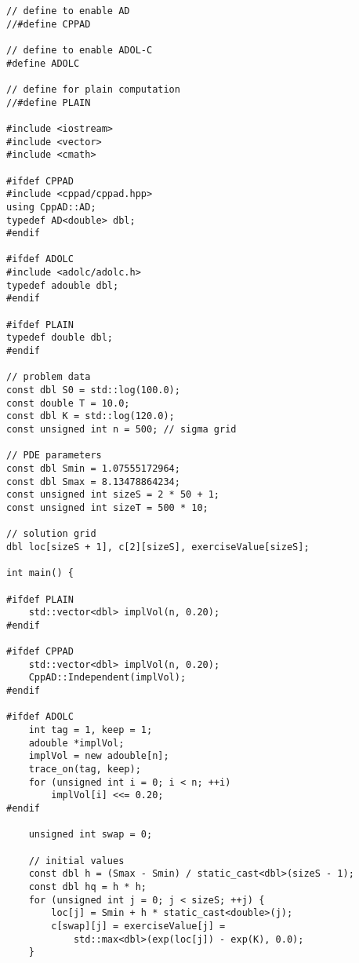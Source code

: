 \documentclass{amsart}
\theoremstyle{plain}
\numberwithin{equation}{section}
\begin{document}
\begin{verbatim}
// define to enable AD
//#define CPPAD

// define to enable ADOL-C
#define ADOLC

// define for plain computation
//#define PLAIN

#include <iostream>
#include <vector>
#include <cmath>

#ifdef CPPAD
#include <cppad/cppad.hpp>
using CppAD::AD;
typedef AD<double> dbl;
#endif

#ifdef ADOLC
#include <adolc/adolc.h>
typedef adouble dbl;
#endif

#ifdef PLAIN
typedef double dbl;
#endif

// problem data
const dbl S0 = std::log(100.0);
const double T = 10.0;
const dbl K = std::log(120.0);
const unsigned int n = 500; // sigma grid

// PDE parameters
const dbl Smin = 1.07555172964;
const dbl Smax = 8.13478864234;
const unsigned int sizeS = 2 * 50 + 1;
const unsigned int sizeT = 500 * 10;

// solution grid
dbl loc[sizeS + 1], c[2][sizeS], exerciseValue[sizeS];

int main() {

#ifdef PLAIN
    std::vector<dbl> implVol(n, 0.20);
#endif

#ifdef CPPAD
    std::vector<dbl> implVol(n, 0.20);
    CppAD::Independent(implVol);
#endif

#ifdef ADOLC
    int tag = 1, keep = 1;
    adouble *implVol;
    implVol = new adouble[n];
    trace_on(tag, keep);
    for (unsigned int i = 0; i < n; ++i)
        implVol[i] <<= 0.20;
#endif

    unsigned int swap = 0;

    // initial values
    const dbl h = (Smax - Smin) / static_cast<dbl>(sizeS - 1);
    const dbl hq = h * h;
    for (unsigned int j = 0; j < sizeS; ++j) {
        loc[j] = Smin + h * static_cast<double>(j);
        c[swap][j] = exerciseValue[j] =
            std::max<dbl>(exp(loc[j]) - exp(K), 0.0);
    }


\end{verbatim}
\end{document}
